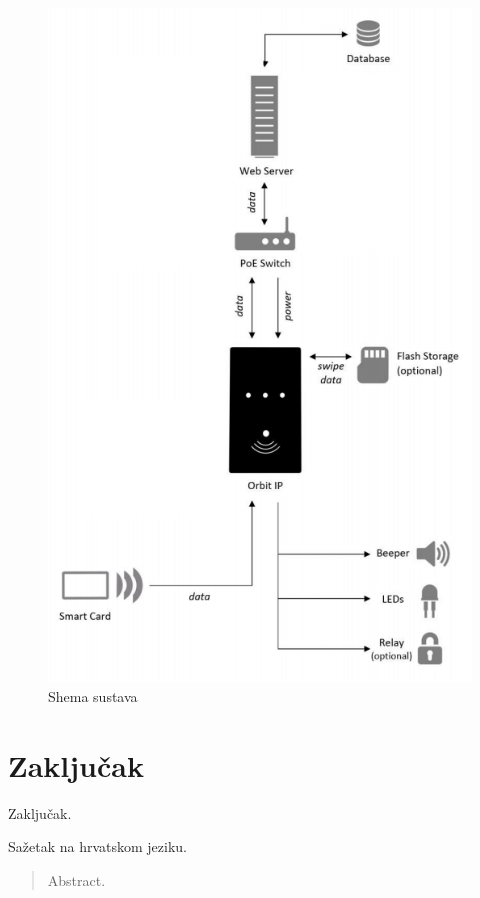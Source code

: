 \documentclass[times, utf8, zavrsni]{fer}
\begin{document}
\begin{figure}[h]
\includegraphics[scale=0.5]{arhitektura.png}
\centering
\caption{Shema sustava}
\centering
\end{figure}


\chapter{Zaključak}
Zaključak.




\begin{sazetak}
Sažetak na hrvatskom jeziku.

\end{sazetak}

\begin{abstract}
Abstract.

\end{abstract}
\end{document}
